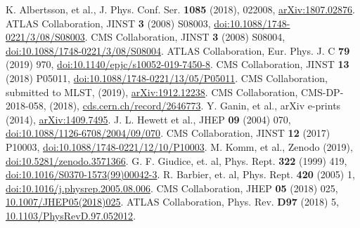 \documentclass{webofc}
\begin{document}
\begin{thebibliography}{}
 K. Albertsson, et al., J. Phys. Conf. Ser. \textbf{1085} (2018), 022008, \href{http://www.arxiv.org/abs/1807.02876}{arXiv:1807.02876}.
 ATLAS Collaboration, JINST \textbf{3} (2008) S08003, \href{http://dx.doi.org/10.1088/1748-0221/3/08/S08003}{doi:10.1088/1748-0221/3/08/S08003}.
  CMS Collaboration, JINST \textbf{3} (2008) S08004,
\href{http://dx.doi.org/10.1088/1748-0221/3/08/S08004}{doi:10.1088/1748-0221/3/08/S08004}.
 ATLAS Collaboration, Eur. Phys. J. C \textbf{79} (2019) 970, \href{http://dx.doi.org/10.1140/epjc/s10052-019-7450-8}{doi:10.1140/epjc/s10052-019-7450-8}.
 CMS Collaboration, JINST \textbf{13} (2018) P05011,
\href{http://dx.doi.org/10.1088/1748-0221/13/05/P05011}{doi:10.1088/1748-0221/13/05/P05011}.
 CMS Collaboration, submitted to MLST, (2019), \href{https://arxiv.org/abs/1912.12238}{arXiv:1912.12238}.
 CMS Collaboration, CMS-DP-2018-058, (2018), \href{https://cds.cern.ch/record/2646773}{cds.cern.ch/record/2646773}.
 Y. Ganin, et al., arXiv e-prints (2014), \href{https://arxiv.org/abs/1409.7495}{arXiv:1409.7495}.
 J. L. Hewett et al., JHEP \textbf{09} (2004) 070, \href{http://dx.doi.org/10.1088/1126-6708/2004/09/070}{doi:10.1088/1126-6708/2004/09/070}.
 CMS Collaboration, JINST \textbf{12} (2017) P10003, \href{http://dx.doi.org/10.1088/1748-0221/12/10/P10003}{doi:10.1088/1748-0221/12/10/P10003}.
 M. Komm, et al., Zenodo (2019), \href{http://dx.doi.org/10.5281/zenodo.3571366}{doi:10.5281/zenodo.3571366}.
 G. F. Giudice, et. al, Phys. Rept. \textbf{322} (1999) 419, \href{http://dx.doi.org/10.1016/S0370-1573(99)00042-3}{doi:10.1016/S0370-1573(99)00042-3}.
 R. Barbier, et. al, Phys. Rept. \textbf{420} (2005) 1, \href{http://dx.doi.org/10.1016/j.physrep.2005.08.006}{doi:10.1016/j.physrep.2005.08.006}.
 CMS Collaboration, JHEP \textbf{05} (2018) 025, \href{http://dx.doi.org/10.1007/JHEP05(2018)025}{10.1007/JHEP05(2018)025}.
 ATLAS Collaboration, Phys. Rev. \textbf{D97} (2018) 5, \href{http://dx.doi.org/10.1103/PhysRevD.97.052012}{10.1103/PhysRevD.97.052012}.
\end{thebibliography}
\end{document}
